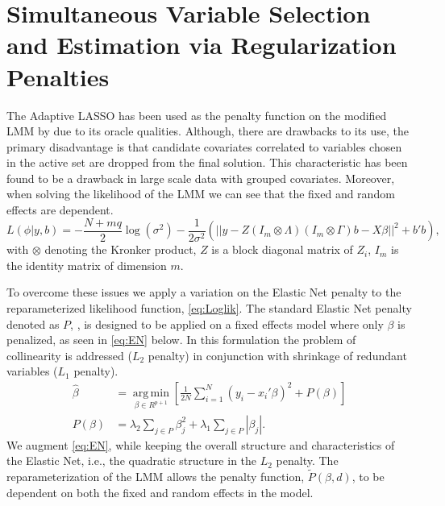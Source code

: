 \documentclass{article}
\DeclareMathOperator*{\argmin}{arg\,min}
\begin{document}
	\section{Simultaneous Variable Selection and Estimation via Regularization Penalties}	
The Adaptive LASSO has been used as the penalty function on the modified LMM by \cite{BKG2010} due to its oracle qualities. Although, there are drawbacks to its use, the primary disadvantage is that candidate covariates correlated to variables chosen in the active set are dropped from the final solution. This characteristic has been found to be a drawback in large scale data with grouped covariates. Moreover, when solving the likelihood of the LMM we can see that the fixed and random effects are dependent.
%		
		\begin{equation}
		\label{eq:Loglik}
		L(\phi|y,b)=-\frac{N+mq}{2}\log(\sigma^2)-\frac{1}{2\sigma^2}(||y-Z(I_m\otimes \Lambda)(I_m\otimes \Gamma) b-X\beta||^2+b'b),
		\end{equation}
		with $\otimes$ denoting the Kronker product, $Z$ is a block diagonal matrix of $Z_i$, $I_m$ is the identity matrix of dimension $m$.
%

To overcome these issues we apply a variation on the Elastic Net penalty to the reparameterized likelihood function, \eqref{eq:Loglik}. The standard Elastic Net penalty denoted as $P$, \cite{FHT2010}, is designed to be applied on a fixed effects model where only $\beta$ is penalized, as seen in \eqref{eq:EN} below. In this formulation the problem of collinearity is addressed ($L_2$ penalty) in conjunction with shrinkage of redundant variables  ($L_1$ penalty).
%		
			\begin{equation}
			\begin{split}
			\hat{\beta}&=\argmin\limits_{\beta\in R^{p+1}}\left[\frac{1}{2N}\sum\limits_{i=1}^{N} (y_i-x_i'\beta)^2 + P(\beta)\right]\\
			P(\beta)&=\lambda_2\sum\limits_{j \in P}\beta_j^2+\lambda_1\sum\limits_{j \in P}|\beta_j|.
			\end{split}
			\label{eq:EN}
			\end{equation}
%
We augment \eqref{eq:EN}, while keeping the overall structure and characteristics of the Elastic Net, i.e., the quadratic structure in the $L_2$ penalty. The reparameterization of the LMM allows the penalty function, $\tilde{P}(\beta,d)$, to be dependent on both the fixed and random effects in the model.
\end{document}
